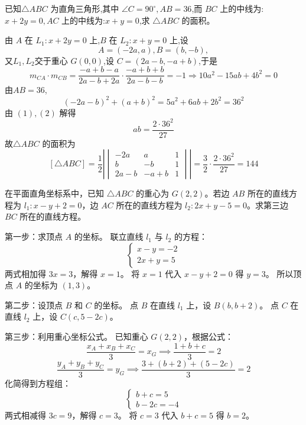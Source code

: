 \begin{questions}
    \question 已知$\triangle ABC$ 为直角三角形,其中 $\angle C=90^{\circ},AB=36$,而 $BC$ 上的中线为:$x+2y=0,AC$ 上的中线为:$x+y=0$,求 $\triangle ABC$ 的面积。
    \begin{solution}
        由 $A$ 在 $L_1: x+2y=0$ 上,$B$ 在 $L_2: x+y=0$ 上,设 
        \[
        A = (-2a, a),B = (b, -b),
        \]
        又$L_1,L_2$交于重心 $G(0,0)$,设 $C = (2a-b, -a+b)$,于是
        \[
        m_{CA}\cdot m_{CB}=\frac{-a+b-a}{2a-b+2a} \cdot \frac{-a+b+b}{2a-b-b}=-1 \Rightarrow 10a^2 - 15ab + 4b^2 = 0 \tag{1}
        \]
        由$AB = 36$,
        \[
        (-2a - b)^2 + (a + b)^2 = 5a^2 + 6ab + 2b^2 = 36^2 \tag{2}
        \]
        由 $(1),(2)$ 解得
        \[
        ab = \frac{2 \cdot 36^2}{27}
        \]
        故$\triangle ABC$ 的面积为
        \[
        [\triangle ABC] = \frac{1}{2} 
        \left|\begin{vmatrix} 
            -2a & a & 1 \\ b & -b & 1 \\ 2a - b & -a + b & 1 
        \end{vmatrix}\right|
        = \frac{3}{2} \cdot \frac{2 \cdot 36^2}{27} = 144
        \]
    \end{solution}

    \question 在平面直角坐标系中，已知 $\triangle ABC$ 的重心为 $G(2, 2)$。若边 $AB$ 所在的直线方程为 $l_{1}: x - y + 2 = 0$，边 $AC$ 所在的直线方程为 $l_{2}: 2x + y - 5 = 0$。求第三边 $BC$ 所在的直线方程。

\begin{solution}
第一步：求顶点 $A$ 的坐标。
联立直线 $l_{1}$ 与 $l_{2}$ 的方程：
\[
\begin{cases} x - y = -2 \\ 2x + y = 5 \end{cases}
\]
两式相加得 $3x = 3$，解得 $x = 1$。
将 $x = 1$ 代入 $x - y + 2 = 0$ 得 $y = 3$。
所以顶点 $A$ 的坐标为 $(1, 3)$。

第二步：设顶点 $B$ 和 $C$ 的坐标。
点 $B$ 在直线 $l_{1}$ 上，设 $B(b, b + 2)$。
点 $C$ 在直线 $l_{2}$ 上，设 $C(c, 5 - 2c)$。

第三步：利用重心坐标公式。
已知重心 $G(2, 2)$，根据公式：
\[
\frac{x_{A} + x_{B} + x_{C}}{3} = x_{G} \implies \frac{1 + b + c}{3} = 2
\]
\[
\frac{y_{A} + y_{B} + y_{C}}{3} = y_{G} \implies \frac{3 + (b + 2) + (5 - 2c)}{3} = 2
\]
化简得到方程组：
\[
\begin{cases} b + c = 5 \\ b - 2c = -4 \end{cases}
\]
两式相减得 $3c = 9$，解得 $c = 3$。
将 $c = 3$ 代入 $b + c = 5$ 得 $b = 2$。


\end{solution}
\end{questions}
